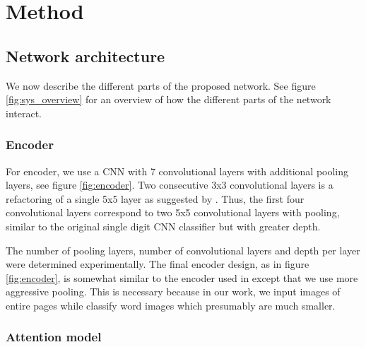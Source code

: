 \section{Method}

\subsection{Network architecture}



We now describe the different parts of the proposed network. See figure \ref{fig:sys_overview} for an overview of how the different parts of the network interact.

\subsubsection{Encoder}



For encoder, we use a CNN with 7 convolutional layers with additional pooling layers, see figure \ref{fig:encoder}.
Two consecutive 3x3 convolutional layers is a refactoring of a single 5x5 layer as suggested by \cite{InceptionV3}. Thus, the first four convolutional layers correspond to two 5x5 convolutional layers with pooling, similar to the original single digit CNN classifier \cite{lecun_1989} but with greater depth.

The number of pooling layers, number of convolutional layers and depth per layer were determined experimentally. The final encoder design, as in figure \ref{fig:encoder}, is somewhat similar to the encoder used in \cite{FornesCnnCategorization} except that we use more aggressive pooling. This is necessary because in our work, we input images of entire pages while \cite{FornesCnnCategorization} classify word images which presumably are much smaller.





\subsubsection{Attention model}

